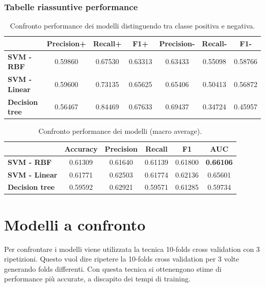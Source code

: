 \subsubsection{Tabelle riassuntive performance}
\begin{table}[H]
	\begin{center}
		\begin{tabular}{ | l | c | c | c | c |  c | c |}
			\hline
			& \textbf{Precision+} & \textbf{Recall+} &\textbf{ F1+ }	& \textbf{Precision-} &\textbf{ Recall-} & \textbf{F1-} \\
			\hline
			\textbf{SVM - RBF} & 0.59860 & 0.67530  & 0.63313 &
												    0.63433 & 0.55098 & 0.58766\\
			\textbf{SVM - Linear} & 0.59600 & 0.73135 & 0.65625&
													0.65406 & 0.50413 & 0.56872\\
			\textbf{Decision tree} & 0.56467&  0.84469 & 0.67633 & 
										0.69437 & 0.34724 & 0.45957 \\
			\hline
		\end{tabular}
	\end{center}
	\caption{Confronto performance dei modelli distinguendo tra classe positiva e negativa.}
\end{table}




\begin{table}[H]
	\begin{center}
		\begin{tabular}{ | l | c | c | c | c |  c |}
			\hline
			& \textbf{Accuracy} & \textbf{Precision} &\textbf{ Recall }	& \textbf{F1} &\textbf{ AUC} \\
			\hline
			\textbf{SVM - RBF} & 0.61309 & 0.61640 & 0.61139  & 0.61800 & \textbf{0.66106} \\
			\textbf{SVM - Linear} & 0.61771 & 0.62503 & 0.61774 & 0.62136 & 0.65601 \\
			\textbf{Decision tree} & 0.59592 & 0.62921 & 0.59571 	& 0.61285 & 0.59734\\
			\hline
		\end{tabular}
	\end{center}
	\caption{Confronto performance dei modelli (macro average).}
\end{table}


\section{Modelli a confronto}
\label{sec:modelli_confronto}
Per confrontare i modelli viene utilizzata la tecnica 10-folds cross validation con 3 ripetizioni. Questo vuol dire ripetere la 10-folds cross validation per 3 volte generando folds differenti. Con questa tecnica si ottenengono stime di performance più accurate, a discapito dei tempi di training. 

